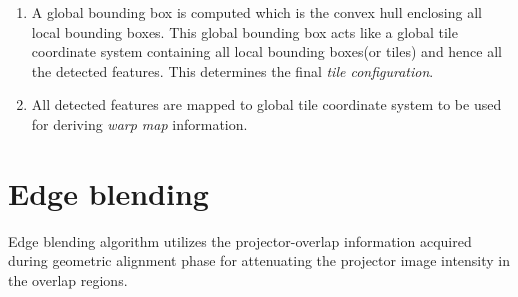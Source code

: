 \documentclass[letterpaper,10pt,conference]{/home/pranav/Desktop/Publication_work/latex_class_files/IEEEtran}
\begin{document}
\begin{enumerate}
\item A global bounding box is computed which is the convex hull enclosing all local bounding boxes. This global bounding box acts like a global tile coordinate system containing all local bounding boxes(or tiles) and hence all the detected features. This determines the final \textit{tile configuration}.

\item All detected features are mapped to global tile coordinate system to be used for deriving \textit{warp map} information.
\end{enumerate}


\section{Edge blending}
Edge blending algorithm utilizes the projector-overlap information acquired during geometric alignment phase for attenuating the projector image intensity in the overlap regions.
\end{document}
